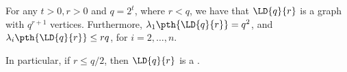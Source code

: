 \begin{theorem}
    For any $t > 0, r>0$ and $q = 2^t$, where $r<q$, we have that
    $\LD{q}{r}$ is a graph with $q^{r+1}$ vertices. Furthermore,
    $\lambda_1\pth{\LD{q}{r}} = q^2$, and $\lambda_i\pth{\LD{q}{r}}
    \leq rq$, for $i=2,\ldots, n$.

    In particular, if $r \leq q/2$, then $\LD{q}{r}$ is a
    .

\end{theorem}
